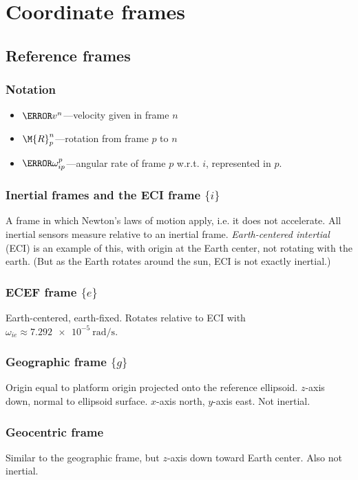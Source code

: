 \section{Coordinate frames}

\subsection{Reference frames}

\subsubsection{Notation}
\begin{itemize}
    \item $\V{v}^n$---velocity given in frame $n$
    \item $\M{R}_p^n$---rotation from frame $p$ to $n$
    \item $\V{\omega}_{ip}^p$---angular rate of frame $p$ w.r.t. $i$, represented in $p$.
\end{itemize}

\subsubsection{Inertial frames and the ECI frame $\{i\}$}
A frame in which Newton's laws of motion apply, i.e. it does not accelerate. All inertial sensors measure relative to an inertial frame. \emph{Earth-centered intertial} (ECI) is an example of this, with origin at the Earth center, not rotating with the earth. (But as the Earth rotates around the sun, ECI is not exactly inertial.)

\subsubsection{ECEF frame $\{e\}$}
Earth-centered, earth-fixed. Rotates relative to ECI with $\omega_{ie} \approx \SI{7.292e-5}{\radian\per\second}$.

\subsubsection{Geographic frame $\{g\}$}
Origin equal to platform origin projected onto the reference ellipsoid. $z$-axis down, normal to ellipsoid surface. $x$-axis north, $y$-axis east. Not inertial.

\subsubsection{Geocentric frame}
Similar to the geographic frame, but $z$-axis down toward Earth center. Also not inertial.

